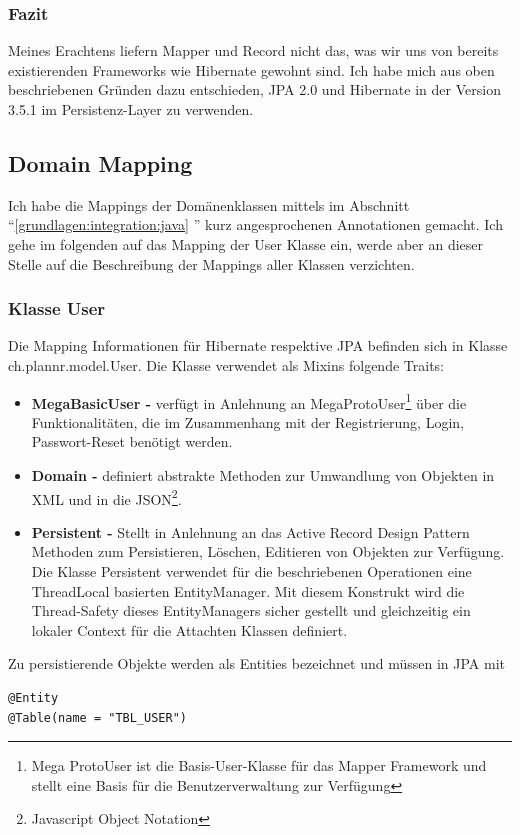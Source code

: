 \subsubsection{Fazit}
Meines Erachtens liefern Mapper und Record nicht das, was wir uns von bereits existierenden Frameworks wie Hibernate gewohnt sind. Ich habe mich aus oben beschriebenen Gr\"unden dazu entschieden, JPA 2.0 und Hibernate in der Version 3.5.1 im Persistenz-Layer zu verwenden. 

\subsection{Domain Mapping}
Ich habe die Mappings der Dom\"anenklassen mittels im Abschnitt ``\ref{grundlagen:integration:java} '' kurz angesprochenen Annotationen gemacht. Ich gehe im folgenden auf das Mapping der User Klasse ein, werde aber an dieser Stelle auf die Beschreibung der Mappings aller Klassen verzichten. 

\subsubsection{Klasse User}
Die Mapping Informationen f\"ur Hibernate respektive JPA befinden sich in Klasse ch.plannr.model.User. Die Klasse verwendet als Mixins folgende Traits:
\begin{itemize}
	\item \textbf{MegaBasicUser - } verf\"ugt in Anlehnung an MegaProtoUser\footnote{Mega ProtoUser ist die Basis-User-Klasse f\"ur das Mapper Framework und stellt eine Basis f\"ur die Benutzerverwaltung zur Verf\"ugung} \"uber die Funktionalit\"aten, die im Zusammenhang mit der Registrierung, Login, Passwort-Reset ben\"otigt werden. 
	\item \textbf{Domain -} definiert abstrakte Methoden zur Umwandlung von Objekten in XML und in die JSON\footnote{Javascript Object Notation}. 
	\item \textbf{Persistent - }Stellt in Anlehnung an das Active Record Design Pattern Methoden zum Persistieren, L\"oschen, Editieren von Objekten zur Verf\"ugung. Die Klasse Persistent verwendet f\"ur die beschriebenen Operationen eine ThreadLocal basierten EntityManager. Mit diesem Konstrukt wird die Thread-Safety dieses EntityManagers sicher gestellt und gleichzeitig ein lokaler Context f\"ur die Attachten Klassen definiert.	
\end{itemize}

Zu persistierende Objekte werden als Entities bezeichnet und m\"ussen in JPA mit 
\begin{lstlisting}[caption=User: ScalaJPA Entity Definiton]
@Entity
@Table(name = "TBL_USER")
\end{lstlisting}

